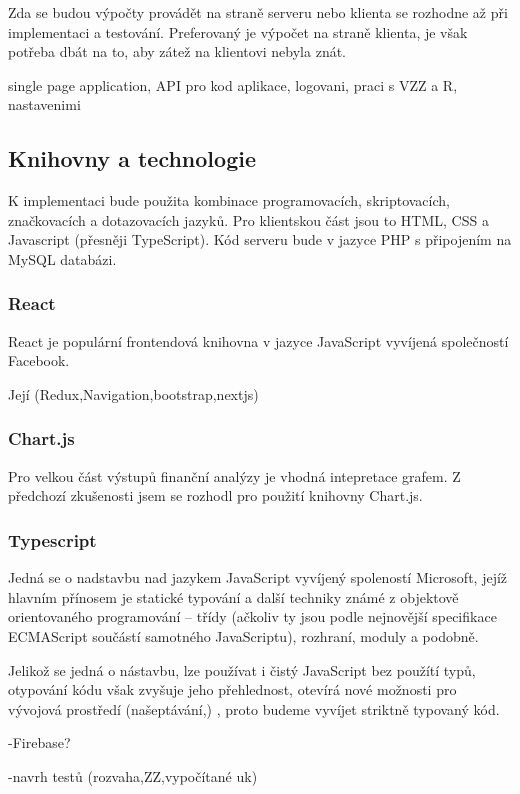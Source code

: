 Zda se budou výpočty provádět na straně serveru nebo klienta se rozhodne až při implementaci a testování. Preferovaný je výpočet na straně klienta, je však potřeba dbát na to, aby zátež na klientovi nebyla znát.

single page application, API pro kod aplikace, logovani, praci s VZZ a R, nastavenimi

\subsection{Knihovny a technologie}
K implementaci bude použita kombinace programovacích, skriptovacích, značkovacích a dotazovacích jazyků. Pro klientskou část jsou to HTML, CSS a Javascript (přesněji TypeScript). Kód serveru bude v jazyce PHP s připojením na MySQL databázi.


\subsubsection{React}
React je populární frontendová knihovna v jazyce JavaScript vyvíjená společností Facebook. 

Její
(Redux,Navigation,bootstrap,nextjs)

\subsubsection{Chart.js}
Pro velkou část výstupů finanční analýzy je vhodná intepretace grafem. Z předchozí zkušenosti jsem se rozhodl pro použití knihovny Chart.js.

\subsubsection{Typescript}
Jedná se o nadstavbu nad jazykem JavaScript vyvíjený spoleností Microsoft, jejíž hlavním přínosem je statické typování a další techniky známé z objektově orientovaného programování -- třídy (ačkoliv ty jsou podle nejnovější specifikace ECMAScript součástí samotného JavaScriptu), rozhraní, moduly a podobně.

Jelikož se jedná o nástavbu, lze používat i čistý JavaScript bez použítí typů, otypování kódu však zvyšuje jeho přehlednost, otevírá nové možnosti pro vývojová prostředí (našeptávání,) , proto budeme vyvíjet striktně typovaný kód.


-Firebase?

-navrh testů (rozvaha,ZZ,vypočítané uk)

